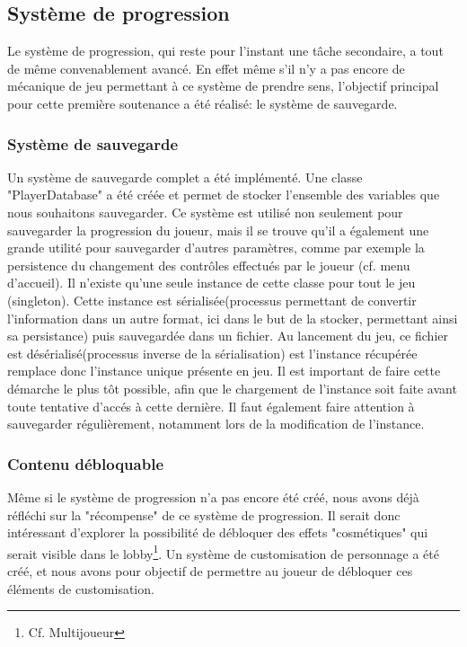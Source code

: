 \subsection{Système de progression}
    Le système de progression, qui reste pour l'instant une tâche secondaire, a tout de même convenablement avancé. En effet même s'il n'y a pas 
    encore de mécanique de jeu permettant à ce système de prendre sens, l'objectif principal pour cette première soutenance a été réalisé: le système 
    de sauvegarde.

    \subsubsection{Système de sauvegarde}
    Un système de sauvegarde complet a été implémenté. Une classe "PlayerDatabase" a été créée et permet de stocker l'ensemble des variables que nous 
    souhaitons sauvegarder. Ce système est utilisé non seulement pour sauvegarder la progression du joueur, mais il se trouve qu'il a également une grande 
    utilité pour sauvegarder d'autres paramètres, comme par exemple la persistence du changement des contrôles effectués par le joueur (cf. menu d'accueil). 
    Il n'existe qu'une seule instance de cette classe pour tout le jeu (singleton). Cette instance est sérialisée(processus permettant de convertir 
    l'information dans un autre format, ici dans le but de la stocker, permettant ainsi sa persistance) puis sauvegardée dans un fichier. Au lancement du 
    jeu, ce fichier est désérialisé(processus inverse de la sérialisation) est l'instance récupérée remplace donc l'instance unique présente en jeu. Il est 
    important de faire cette démarche le plus tôt possible, afin que le chargement de l'instance soit faite avant toute tentative d'accés à cette dernière. 
    Il faut également faire attention à sauvegarder régulièrement, notamment lors de la modification de l'instance.

    \subsubsection{Contenu débloquable}
    Même si le système de progression n'a pas encore été créé, nous avons déjà réfléchi sur la "récompense" de ce système de progression. Il serait donc 
    intéressant d'explorer la possibilité de débloquer des effets "cosmétiques" qui serait visible dans le lobby\footnote{Cf. Multijoueur}. Un système de 
    customisation de personnage a été créé, et nous avons pour objectif de permettre au joueur de débloquer ces éléments de customisation.

